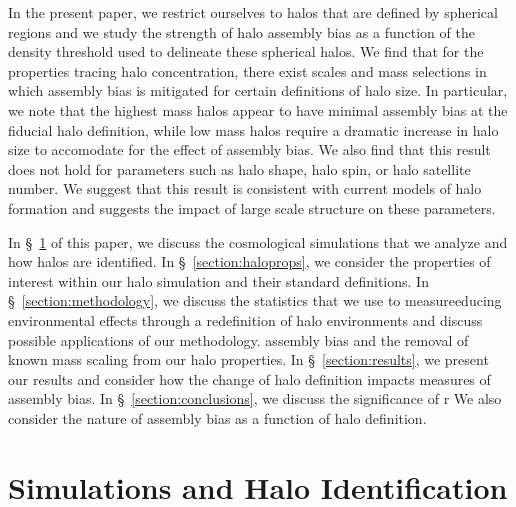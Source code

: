 \documentclass[usenatbib]{mnras}
\begin{document}
In the present paper, we restrict ourselves to halos that are defined by spherical regions and we 
study the strength of halo assembly bias as a function of the density threshold used to delineate these 
spherical halos. We find that for the properties tracing halo concentration, there exist scales and mass selections in which
assembly bias is mitigated for certain definitions of halo size. In particular, we note that the highest mass halos appear to have
minimal assembly bias at the fiducial halo definition, while low mass halos require a dramatic increase in halo size to accomodate for the
effect of assembly bias. We also find that this result does not hold for parameters such as halo shape, halo spin, or halo satellite number. 
We suggest that this result is consistent with current models of halo formation and suggests the impact of large scale structure on these 
parameters.

 
In \S~\ref{section:data} of this paper, we discuss the cosmological simulations that we analyze and how halos are
identified. In \S~\ref{section:haloprops}, we consider the properties of interest within our halo simulation and
their standard definitions. In \S~\ref{section:methodology}, we discuss the statistics that we use to measureeducing environmental effects through a
redefinition of halo environments and discuss possible applications of our methodology.
assembly bias and the removal of known mass scaling from our halo properties. In \S~\ref{section:results}, we
present our results and consider how the change of halo definition impacts measures of assembly bias. In
\S~\ref{section:conclusions}, we discuss the significance of r We also consider the
nature of assembly bias as a function of halo definition.





\section[]{Simulations and Halo Identification}
\label{section:data}
\end{document}
